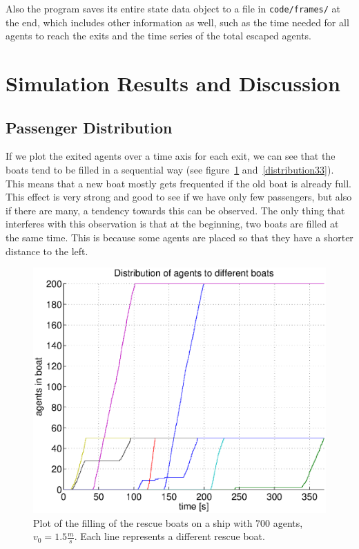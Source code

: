 \documentclass[11pt]{article}
\begin{document}
Also the program saves its entire state data object to a file in
\texttt{code/frames/} at the end, which includes other information as well,
such as the time needed for all agents to reach the exits and the time series
of the total escaped agents.

\section{Simulation Results and Discussion}

\subsection{Passenger Distribution} %

If we plot the exited agents over a time axis for each exit, we can see that
the boats tend to be filled in a sequential way (see
figure~\ref{distribution11} and~\ref{distribution33}).  This means that a new
boat mostly gets frequented if the old boat is already full.  This effect is
very strong and good to see if we have only few passengers, but also if there
are many, a tendency towards this can be observed. The only thing that
interferes with this observation is that at the beginning, two boats are filled
at the same time.  This is because some agents are placed so that they have a
shorter distance to the left.

\begin{figure}[h]
	\centering
	\includegraphics[scale=0.5]{images/distribution11.eps}
    \caption{Plot of the filling of the rescue boats on a ship with 700 agents,
    \(v_0=1.5\frac{m}{s}\).
	Each line represents a different rescue boat.}
	\label{distribution11}
\end{figure}
\end{document}
